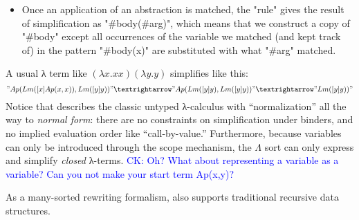 \documentclass[letterpaper,11pt]{article}
\newcommand{\CK}[1]{\textcolor{blue}{CK: #1}}
\begin{document}
\begin{example}
\begin{itemize}
    \CK{This partiality is debatable: in fact, the scheme is defined for all constructor-terms
    with output sort Λ.  It is only undefined for variables, but the same could be said for the
    Plus rules! I suppose the difference is that the Plus system does not admit closed terms
    containing a variable, while this system does.  But if that is the crucial point, it should
    be explained more fully, or not be brought up at all.}

  \item Once an application of an abstraction is matched, the "rule" gives the result of
    simplification as "#body(#arg)", which means that we construct a copy of "#body" except all
    occurrences of the variable we matched (and kept track of) in the pattern "#body(x)" are
    substituted with what "#arg" matched.


  \end{itemize}
  A usual λ term like $(λx.x x)(λy.y)$ simplifies like this:
  \begin{displaymath}
    "Ap(Lm([x]Ap(x, x)), Lm([y]y))" →
    "Ap(Lm([y]y), Lm([y]y))" →
    "Lm([y]y))"
  \end{displaymath}
  Notice that \hax describes the classic untyped λ-calculus with ``normalization'' all the way to
  \emph{normal form}: there are no constraints on simplification under binders, and no implied
  evaluation order like ``call-by-value.'' Furthermore, because variables can only be introduced
  through the scope mechanism, the $Λ$ sort can only express and simplify \emph{closed} λ-terms.
  \CK{Oh? What about representing a variable as a variable?  Can you not make your start term
  Ap(x,y)?}
\end{example}

As a many-sorted rewriting formalism, \hax also supports traditional recursive data structures.
\end{document}
